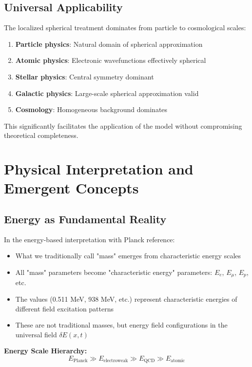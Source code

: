 \documentclass[12pt,a4paper]{report}
\begin{document}
	\subsection{Universal Applicability}\label{subsec:universal_applicability}
	
	The localized spherical treatment dominates from particle to cosmological scales:
	\begin{enumerate}
		\item \textbf{Particle physics}: Natural domain of spherical approximation
		\item \textbf{Atomic physics}: Electronic wavefunctions effectively spherical
		\item \textbf{Stellar physics}: Central symmetry dominant
		\item \textbf{Galactic physics}: Large-scale spherical approximation valid
		\item \textbf{Cosmology}: Homogeneous background dominates
	\end{enumerate}
	
	This significantly facilitates the application of the model without compromising theoretical completeness.
	
	\section{Physical Interpretation and Emergent Concepts}\label{sec:physical_interpretation}
	
	\subsection{Energy as Fundamental Reality}\label{subsec:energy_fundamental}
	
	In the energy-based interpretation with Planck reference:
	\begin{itemize}
		\item What we traditionally call "mass" emerges from characteristic energy scales
		\item All "mass" parameters become "characteristic energy" parameters: $E_e$, $E_\mu$, $E_p$, etc.
		\item The values (0.511 MeV, 938 MeV, etc.) represent characteristic energies of different field excitation patterns
		\item These are not traditional masses, but energy field configurations in the universal field $\delta E(x,t)$
	\end{itemize}
	
	\textbf{Energy Scale Hierarchy:}
	\begin{equation}
		E_{\text{Planck}} \gg E_{\text{electroweak}} \gg E_{\text{QCD}} \gg E_{\text{atomic}}
	\end{equation}
	
\end{document}

